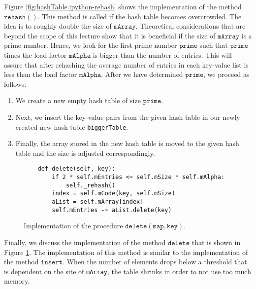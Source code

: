 Figure \ref{fig:hashTable.ipython-rehash} shows the implementation of the method
$\texttt{rehash}()$.  This method is called if the hash table becomes overcrowded.  The idea is to
roughly double the size of $\texttt{mArray}$.  Theoretical considerations that are  beyond the scope
of this lecture show that it is beneficial if the size of $\texttt{mArray}$ is a prime number.
Hence, we look for the first prime number $\texttt{prime}$ such that $\texttt{prime}$ times the load
factor $\texttt{mAlpha}$ is bigger than the
number of entries.  This will assure that after rehashing the average number of entries in each key-value
list is less than the load factor $\texttt{mAlpha}$.  After we have determined $\texttt{prime}$, we
proceed as follows: 
\begin{enumerate}
\item We create a new empty hash table of size $\texttt{prime}$.
\item Next, we insert the key-value pairs from the given hash table in our newly created new hash table
      \texttt{biggerTable}.
\item Finally, the array stored in the new hash table is moved to the given hash table
      and the size is adjusted correspondingly.
\end{enumerate}

\begin{figure}[!ht]
\centering
\begin{verbatim}
    def delete(self, key):
        if 2 * self.mEntries <= self.mSize * self.mAlpha:
            self._rehash()
        index = self.mCode(key, self.mSize)
        aList = self.mArray[index]
        self.mEntries -= aList.delete(key)
\end{verbatim}
\vspace*{-0.3cm}
\caption{Implementation of the procedure $\texttt{delete}(\texttt{map}, \texttt{key})$.}
\label{fig:HashMap.ipynb-delete}
\end{figure}

Finally, we discuss the implementation of the method $\texttt{delete}$ that is shown in Figure
\ref{fig:HashMap.ipynb-delete}.  The implementation of this method is similar to the implementation
of the method $\texttt{insert}$.  When the number of elements drops below a threshold that is dependent on the
site of \texttt{mArray}, the table shrinks in order to not use too much memory.

